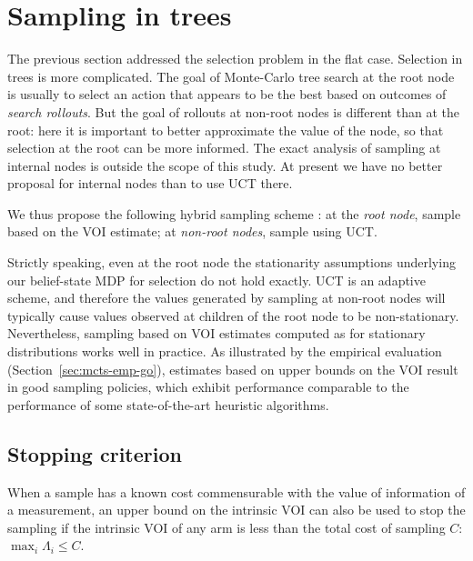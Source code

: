 \section{Sampling in trees}
\label{sec:mcts-sampling-in-trees}

The previous section addressed the selection problem in the flat case.
Selection in trees is more complicated.  The goal of Monte-Carlo tree 
search \cite{Chaslot.montecarlo} at the root node 
is usually to select an action that appears to be the best based on outcomes
of \textit{search rollouts}.
But the goal of rollouts at non-root nodes
is different than at the root: here it is important to better approximate the
value of the node, so that selection at the root can be more informed. The exact analysis
of sampling at internal nodes is outside the scope of this study. At present we 
have no better proposal for internal nodes than to use UCT there.

We thus propose the following hybrid sampling scheme \cite{TolpinShimony.mcts}: 
	at the \emph{root node}, sample based on the VOI estimate;
	at \emph{non-root nodes}, sample using UCT.

Strictly speaking, even at the root node the stationarity assumptions
underlying our belief-state MDP for selection do not hold exactly. UCT
is an adaptive scheme, and therefore the values generated by sampling
at non-root nodes will typically cause values observed at children of
the root node to be non-stationary.  Nevertheless, sampling based on
VOI estimates computed as for stationary distributions works well in
practice. As illustrated by the empirical evaluation
(Section~\ref{sec:mcts-emp-go}), estimates based on
upper bounds on the VOI result in good sampling policies, which
exhibit performance comparable to the performance of some
state-of-the-art heuristic algorithms.


\subsection{Stopping criterion}
\label{sec:mcts-control-stopping-criterion}

When a sample has a known cost commensurable with the value of
information of a measurement, an upper bound on the intrinsic VOI can also
be used to stop the sampling if the intrinsic VOI of any arm
is less than the total cost of sampling $C$: $\max_i \Lambda_i \le C$.

